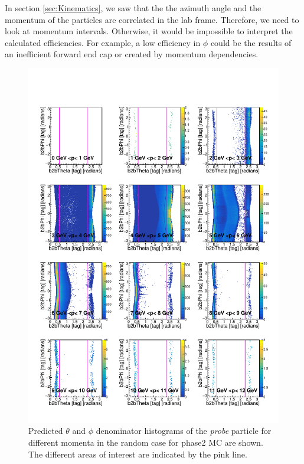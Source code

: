 \documentclass[a4paper,11pt,twosided,final,german,openbib,pdftex,listof=totoc,bibliography=totoc]{scrbook}
\begin{document}
In section \ref{sec:Kinematics}, we saw that the the azimuth angle and the momentum of the particles are correlated in the lab frame. Therefore, we need to look at momentum intervals. Otherwise, it would be impossible to interpret the calculated efficiencies. For example, a low efficiency in $\phi$ could be the results of an inefficient forward end cap or created by momentum dependencies.




\begin{figure}[h!]
	\includegraphics[width=\textwidth]{Plots/RTPMRandomD_MC.pdf}
	\caption[Denominator $\theta$, $\phi$ Random Momentum MC]{Predicted $\theta$ and $\phi$ denominator histograms of the \textit{probe} particle for different momenta in the random case for phase2 MC are shown. The different areas of interest are indicated by the pink line.}
	\label{plt:RTPMRandomD_MC}
\end{figure}
\end{document}
